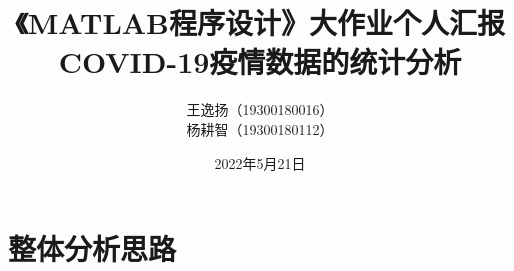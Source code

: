 \documentclass[a4paper, titlepage]{article}
\begin{document}
    \renewcommand{\thefootnote}{\fnsymbol{footnote}}
    \title{{\small《MATLAB程序设计》大作业个人汇报}\\COVID-19疫情数据的统计分析\footnotemark[1]}
    \author{王逸扬（19300180016）\\杨耕智（19300180112）{\kaishu }}
    \date{2022年5月21日}
    \maketitle
    \renewcommand{\thefootnote}{\araboc{footnote}}
    \renewcommand{\contentsname}{\centering 目录}
    \tableofcontents

    \section{整体分析思路}
\end{document}
